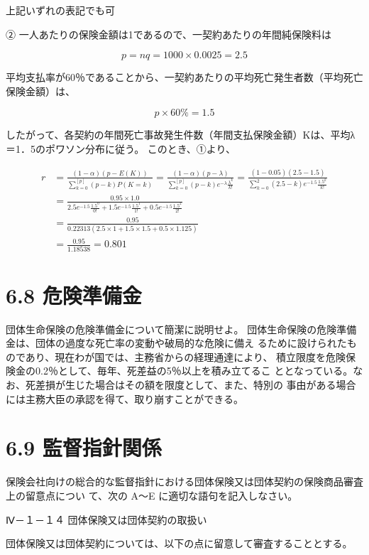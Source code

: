 \documentclass[report,gutter=10mm,fore-edge=10mm,uplatex,dvipdfmx]{jlreq}
\begin{document}
上記いずれの表記でも可

② 一人あたりの保険金額は1であるので、一契約あたりの年間純保険料は

$$p=nq=1000\times 0.0025=2.5$$

平均支払率が60％であることから、一契約あたりの平均死亡発生者数（平均死亡保険金額）は、

$$p\times 60\% = 1.5$$

したがって、各契約の年間死亡事故発生件数（年間支払保険金額）Kは、平均λ＝1．5のポワソン分布に従う。
このとき、①より、

\begin{align*}
 r&=\frac{(1-\alpha)(p-E(K))}{\sum\limits_{k=0}^{[p]}(p-k)P(K=k)}
=\frac{(1-\alpha)(p-\lambda)}{\sum\limits_{k=0}^{[p]}(p-k) e^{-\lambda}\frac{\lambda^k}{k!}}
=\frac{(1-0.05)(2.5-1.5)}{\sum_{k=0}^{2}(2.5-k)e^{-1.5}\frac{1.5^k}{k!}}\\
&=\frac{0.95\times 1.0}{
2.5e^{-1.5}\frac{1.5^0}{0!} 
+ 1.5e^{-1.5}\frac{1.5^1}{1!} 
+ 0.5e^{-1.5}\frac{1.5^2}{2!} 
}\\
&=\frac{0.95}{0.22313(2.5\times 1 + 1.5\times 1.5 + 0.5 \times 1.125)}\\
&=\frac{0.95}{1.18538} = 0.801
\end{align*}

\section{6.8 危険準備金}

団体生命保険の危険準備金について簡潔に説明せよ。
\answer{}
団体生命保険の危険準備金は、団体の過度な死亡率の変動や破局的な危険に備え
るために設けられたものであり、現在わが国では、主務省からの経理通達により、
積立限度を危険保険金の0.2％として、毎年、死差益の5％以上を積み立てるこ
ととなっている。なお、死差損が生じた場合はその額を限度として、また、特別の
事由がある場合には主務大臣の承認を得て、取り崩すことができる。

\section{6.9 監督指針関係}
保険会社向けの総合的な監督指針における団体保険又は団体契約の保険商品審査上の留意点につい
て、次の A～E に適切な語句を記入しなさい。

Ⅳ－１－１４ 団体保険又は団体契約の取扱い

団体保険又は団体契約については、以下の点に留意して審査することとする。
\end{document}
